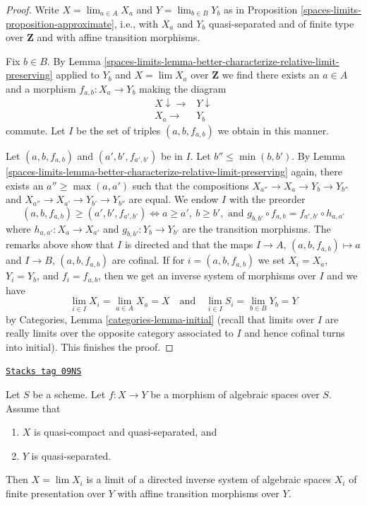\begin{proof}
Write $X = \lim_{a \in A} X_a$ and $Y = \lim_{b \in B} Y_b$ as in
Proposition \ref{spaces-limits-proposition-approximate}, i.e., with $X_a$ and $Y_b$
quasi-separated and of finite type over $\mathbf{Z}$ and
with affine transition morphisms.

\medskip\noindent
Fix $b \in B$.
By Lemma \ref{spaces-limits-lemma-better-characterize-relative-limit-preserving}
applied to $Y_b$ and $X = \lim X_a$ over $\mathbf{Z}$
we find there exists an $a \in A$ and a morphism
$f_{a, b} : X_a \to Y_b$ making the diagram
$$
\begin{array}{cc}X \downarrow\longrightarrow & Y \downarrow \\ X_a \longrightarrow & Y_b\end{array}
$$
commute. Let $I$ be the set of triples $(a, b, f_{a, b})$ we
obtain in this manner.

\medskip\noindent
Let $(a, b, f_{a, b})$ and $(a', b', f_{a', b'})$ be in $I$.
Let $b'' \leq \min(b, b')$. By
Lemma \ref{spaces-limits-lemma-better-characterize-relative-limit-preserving}
again, there exists an $a'' \geq \max(a, a')$ such that
the compositions $X_{a''} \to X_a \to Y_b \to Y_{b''}$ and
$X_{a''} \to X_{a'} \to Y_{b'} \to Y_{b''}$ are equal.
We endow $I$ with the preorder
$$
(a, b, f_{a, b}) \geq (a', b', f_{a', b'})
\Leftrightarrow
a \geq a',\ b \geq b',\text{ and }
g_{b, b'} \circ f_{a, b} = f_{a', b'} \circ h_{a, a'}
$$
where $h_{a, a'} : X_a \to X_{a'}$ and $g_{b, b'} : Y_b \to Y_{b'}$
are the transition morphisms. The remarks above show that $I$
is directed and that the maps $I \to A$, $(a, b, f_{a, b}) \mapsto a$
and $I \to B$, $(a, b, f_{a, b})$ are cofinal. If for $i = (a, b, f_{a, b})$
we set $X_i = X_a$, $Y_i = Y_b$, and $f_i = f_{a, b}$, then we get
an inverse system of morphisms over $I$ and we have
$$
\lim_{i \in I} X_i = \lim_{a \in A} X_a = X
\quad\text{and}\quad
\lim_{i \in I} S_i = \lim_{b \in B} Y_b = Y
$$
by Categories, Lemma \ref{categories-lemma-initial} (recall that
limits over $I$ are really limits over the opposite category
associated to $I$ and hence cofinal turns into initial).
This finishes the proof.
\end{proof}

\begin{lemma}
\label{spaces-limits-lemma-relative-approximation}
\href{https://stacks.math.columbia.edu/tag/09NS}{\texttt{Stacks tag 09NS}}

Let $S$ be a scheme. Let $f : X \to Y$ be a morphism of algebraic spaces
over $S$. Assume that
\begin{enumerate}
\item $X$ is quasi-compact and quasi-separated, and
\item $Y$ is quasi-separated.
\end{enumerate}
Then $X = \lim X_i$ is a limit of a directed inverse system of algebraic spaces
$X_i$ of finite presentation over $Y$ with affine transition morphisms
over $Y$.
\end{lemma}

